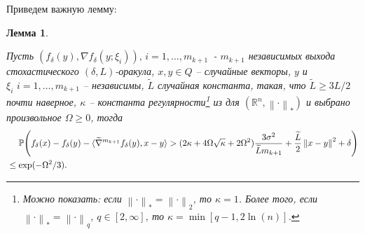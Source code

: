 \documentclass[11pt,a4]{article}
\newcommand{\norm}[1]{\left\lVert#1\right\rVert}
\newtheorem{lemma}{Лемма}
\begin{document}
Приведем важную лемму:
\begin{lemma}
\label{corST2}

Пусть $\left(f_\delta(y), \nabla f_\delta(y;\xi_i)\right),\,i = 1,\dots,m_{k+1}\,$ - $m_{k+1}$ независимых выхода стохастического $(\delta, L)$-оракула, $x, y \in Q$ -- случайные векторы, $y$ и $\xi_i\,\,i = 1,\dots,m_{k+1}$ -- независимы, $\widetilde{L}$ случайная константа, такая, что $\widetilde{L} \geq 3L/2$ почти наверное, $\kappa$ -- константа регулярности\footnote{Можно показать: если $\norm{\cdot}_* = \norm{\cdot}_2$, то $\kappa = 1$. Более того, если $\norm{\cdot}_* = \norm{\cdot}_q$, $q \in [2,\infty]$, то $\kappa = \min\left[q-1,2\ln(n)\right]$.} из \cite{juditsky2008large} для $(\mathds{R}^n,\norm{\cdot}_*)$ и выбрано произвольное $\Omega \geq 0$, тогда
\begin{align*}
&\hphantom{{}={}}\mathbb{P}\Bigg(f_\delta(x) - f_\delta(y) - \langle\widetilde{\nabla}^{m_{k+1}} f_\delta(y), x - y\rangle > (2\kappa + 4\Omega\sqrt{\kappa} + 2\Omega^2)\frac{3\sigma^2}{\widetilde{L}m_{k+1}} + \frac{\widetilde{L}}{2}\norm{x - y}^2 + \delta\Bigg) \\&\leq \exp(-\Omega^2/3).
\end{align*}
\end{lemma}
\end{document}
